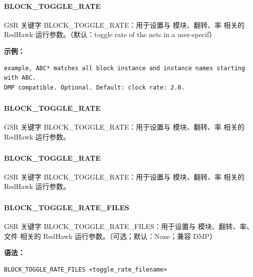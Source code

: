 \paragraph*{BLOCK_TOGGLE_RATE}

GSR 关键字 BLOCK_TOGGLE_RATE：用于设置与 模块、翻转、率 相关的 RedHawk 运行参数。（默认：toggle rate of the nets in a user-specif）

\textbf{示例：}
\begin{lstlisting}
example, ABC* matches all block instance and instance names starting with ABC.
DMP compatible. Optional. Default: clock rate: 2.0.
\end{lstlisting}

\subsubsection{}
\paragraph*{BLOCK_TOGGLE_RATE}

GSR 关键字 BLOCK_TOGGLE_RATE：用于设置与 模块、翻转、率 相关的 RedHawk 运行参数。

\subsubsection{}
\paragraph*{BLOCK_TOGGLE_RATE}

GSR 关键字 BLOCK_TOGGLE_RATE：用于设置与 模块、翻转、率 相关的 RedHawk 运行参数。

\subsubsection{}
\paragraph*{BLOCK_TOGGLE_RATE_FILES}

GSR 关键字 BLOCK_TOGGLE_RATE_FILES：用于设置与 模块、翻转、率、文件 相关的 RedHawk 运行参数。（可选；默认：None；兼容 DMP）

\textbf{语法：}
\begin{lstlisting}
BLOCK_TOGGLE_RATE_FILES <toggle_rate_filename>
\end{lstlisting}

